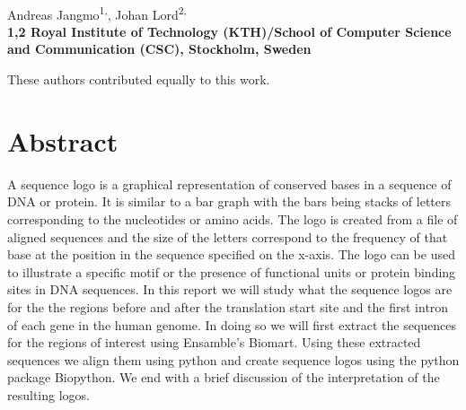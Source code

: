 \documentclass[10pt,letterpaper]{article}
\date{}
\begin{document}
\vspace*{0.35in}

\begin{flushleft}
{\Large
\textbf{}
}
\newline
\\
Andreas Jangmo\textsuperscript{1,\Yinyang},
Johan Lord\textsuperscript{2,\Yinyang}
\\
\bigskip
\bf{1,2} Royal Institute of Technology (KTH)/School of Computer Science and Communication (CSC), Stockholm, Sweden
\bigskip

% 
%
\Yinyang These authors contributed equally to this work.

\end{flushleft}
\section*{Abstract}
A sequence logo is a graphical representation of conserved bases in a sequence of DNA or protein. It is similar to a bar graph with the bars being stacks of letters corresponding to the nucleotides or amino acids. The logo is created from a file of aligned sequences and the size of the letters correspond to the frequency of that base at the position in the sequence specified on the x-axis. The logo can be used to illustrate a specific motif or the presence of functional units or protein binding sites in DNA sequences. In this report we will study what the sequence logos are for the the regions before and after the translation start site and the first intron of each gene in the human genome. In doing so we will first extract the sequences for the regions of interest using Ensamble's Biomart. Using these extracted sequences we align them using python and create sequence logos using the python package Biopython. We end with a brief discussion of the interpretation of the resulting logos.
\end{document}

